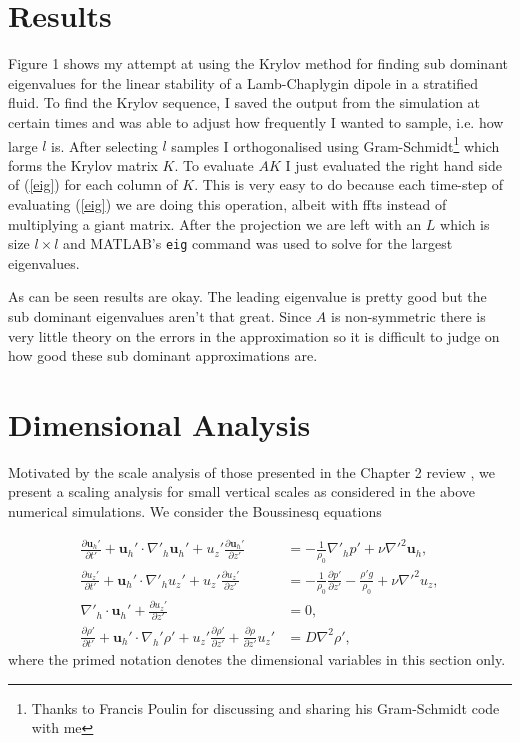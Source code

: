 \section*{Results}
Figure 1 shows my attempt at using the Krylov method for finding sub dominant eigenvalues for the linear stability of a Lamb-Chaplygin dipole in a stratified fluid. To find the Krylov sequence, I saved the output from the simulation at certain times and was able to adjust how frequently I wanted to sample, i.e. how large $l$ is. After selecting $l$ samples I orthogonalised using Gram-Schmidt\footnote{Thanks to Francis Poulin for discussing and sharing his Gram-Schmidt code with me}  which forms the Krylov matrix $K$. To evaluate $AK$ I just evaluated the right hand side of (\ref{eig}) for each column of $K$. This is very easy to do because each time-step of evaluating (\ref{eig}) we are doing this operation, albeit with ffts instead of multiplying a giant matrix. After the projection we are left with an $L$ which is size $l\times l$ and  MATLAB's \texttt{eig} command was used to solve for the largest eigenvalues.

As can be seen results are okay. The leading eigenvalue is pretty good but the sub dominant eigenvalues aren't that great. Since $A$ is non-symmetric there is very little theory on the errors in the approximation so it is difficult to judge on how good these sub dominant approximations are.
\section{Dimensional Analysis}
Motivated by the scale analysis of those presented in the Chapter 2 review \cite{lilly1983,rileylelong2000,bc2001,brethouwer2007}, we present a scaling analysis for small vertical scales as considered in the above numerical simulations. We consider the Boussinesq equations

\begin{align}
\frac{\partial \textbf{u}_{h}'}{\partial t'} + \textbf{u}_{h}'\cdot\nabla'_{h}\textbf{u}_{h}'+u_{z}'\frac{\partial \textbf{u}_{h}'}{\partial z'} &= -\frac{1}{\rho_{0}}\nabla'_{h}p' + \nu \nabla'^{2}\textbf{u}_{h}\label{scaling_horz},\\
\frac{\partial u_{z}'}{\partial t'} + \textbf{u}_{h}'\cdot\nabla'_{h}u_{z}'+u_{z}'\frac{\partial u_{z}'}{\partial z'} &= -\frac{1}{\rho_{0}}\frac{\partial p'}{\partial z'} - \frac{\rho' g}{\rho_{0}} + \nu \nabla'^{2}u_{z},\label{scaling_vert}\\
\nabla'_{h}\cdot\textbf{u}_{h}' + \frac{\partial u_{z}'}{\partial z'} &=0,\label{scaling_cont}\\
\frac{\partial \rho'}{\partial t'} + \textbf{u}_{h}'\cdot\nabla_{h}'\rho' + u_{z}'\frac{\partial \rho'}{\partial z'} + \frac{\partial \rho}{\partial z'}u_{z}'&=D\nabla^{2}\rho ',\label{scaling_moment}
\end{align}
where the primed notation denotes the dimensional variables in this section only. 

